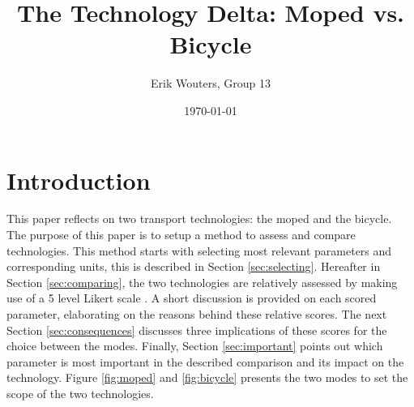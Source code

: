 \documentclass[a4paper]{article}
\title{The Technology Delta: Moped vs. Bicycle}
\author{Erik Wouters, Group 13}
\date{\today}
\begin{document}
\maketitle


\section{Introduction}
\label{sec:introduction}
This paper reflects on two transport technologies: the moped and the bicycle. The purpose of this paper is to setup a method to assess and compare technologies. This method starts with selecting most relevant parameters and corresponding units, this is described in Section \ref{sec:selecting}. Hereafter in Section \ref{sec:comparing}, the two technologies are relatively assessed by making use of a 5 level Likert scale \cite{likert}. A short discussion is provided on each scored parameter, elaborating on the reasons behind these relative scores. The next Section \ref{sec:consequences} discusses three implications of these scores for the choice between the modes. Finally, Section \ref{sec:important} points out which parameter is most important in the described comparison and its impact on the technology. Figure \ref{fig:moped} and \ref{fig:bicycle} presents the two modes to set the scope of the two technologies.

\end{document}
